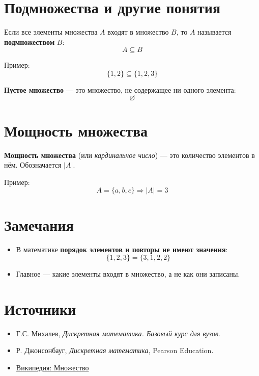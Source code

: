 \documentclass{article}
\begin{document}
\section*{Подмножества и другие понятия}

Если все элементы множества $A$ входят в множество $B$, то $A$ называется \textbf{подмножеством} $B$:
\[
A \subseteq B
\]

Пример:
\[
\{1, 2\} \subseteq \{1, 2, 3\}
\]

\textbf{Пустое множество} — это множество, не содержащее ни одного элемента:
\[
\varnothing
\]

\section*{Мощность множества}

\textbf{Мощность множества} (или \textit{кардинальное число}) — это количество элементов в нём. Обозначается $|A|$.

Пример:
\[
A = \{a, b, c\} \Rightarrow |A| = 3
\]

\section*{Замечания}

\begin{itemize}[leftmargin=*]
  \item В математике \textbf{порядок элементов и повторы не имеют значения}:
  \[
  \{1, 2, 3\} = \{3, 1, 2, 2\}
  \]
  \item Главное — какие элементы входят в множество, а не как они записаны.
\end{itemize}

\section*{Источники}

\begin{itemize}
  \item Г.С. Михалев, \textit{Дискретная математика. Базовый курс для вузов}.
  \item Р. Джонсонбауг, \textit{Дискретная математика}, Pearson Education.
  \item \href{https://ru.wikipedia.org/wiki/Множество}{Википедия: Множество}
\end{itemize}
\end{document}

